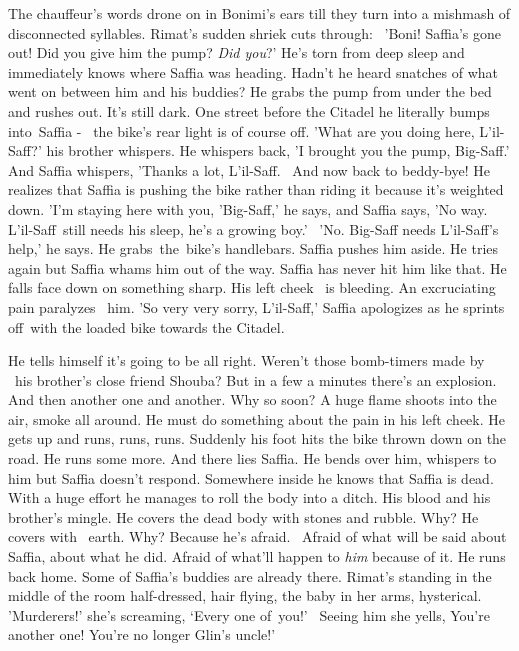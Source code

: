 \documentclass[12pt]{book}
\begin{document}
The chauffeur's words drone on in Bonimi's ears till they turn into a mishmash of disconnected syllables. Rimat's sudden
shriek cuts through: \ {}'Boni! Saffia's gone out! Did you give him the pump? \textit{Did you}?' He's torn from deep
sleep and immediately knows where Saffia was heading. Hadn't he heard snatches of what went on between him and his
buddies? He grabs the pump from under the bed and rushes out. It's still dark. One street before the Citadel he
literally bumps into~Saffia - \ the bike's rear light is of course off. 'What are you doing here, L'il-Saff?' his
brother whispers. He whispers back, 'I brought you the pump, Big-Saff.' And Saffia whispers, 'Thanks a lot, L'il-Saff.
~And now back to beddy-bye!{\textquotedbl} He realizes that Saffia is pushing the bike rather than riding it because
it's weighted down. 'I'm staying here with you, 'Big-Saff,' he says, and Saffia says, 'No way. L'il-Saff~still needs
his sleep, he's a growing boy.' \ {}'No. Big-Saff needs L'il-Saff's help,' he says. He grabs~the~bike's handlebars.
Saffia pushes him aside. He tries again but Saffia whams him out of the way. Saffia has never hit him like that. He
falls face down on something sharp. His left cheek{ \ }is bleeding. An excruciating pain paralyzes
\ him. 'So very very sorry, L'il-Saff,' Saffia apologizes as he sprints off~with the loaded bike towards the Citadel.

He tells himself it's going to be all right. Weren't those bomb-timers made by \ his brother's close friend Shouba? But
in a few a minutes there's an explosion. And then another one and another. Why so soon? A huge flame shoots into the
air, smoke all around. He must do something about the pain in his left cheek. He gets up and runs, runs, runs. Suddenly
his foot hits the bike thrown down on the road. He runs some more. And there lies Saffia. He bends over him, whispers
to him but Saffia doesn't respond. Somewhere inside he knows that Saffia is dead. With a huge effort he manages to roll
the body into a ditch. His blood and his brother's mingle{. }He covers the dead body with stones and
rubble. Why? He covers with \ earth. Why? Because he's afraid. ~Afraid of what will be said about Saffia, about what he
did. Afraid of what'll happen to \textit{him} because of it. He runs back home. Some of Saffia's buddies are already
there. Rimat's standing in the middle of the room half-dressed, hair flying, the baby in her arms, hysterical.
'Murderers!' she's screaming, `Every one of~you!' \ Seeing him she yells, {\textquotedbl}You're another one! You're no
longer Glin's uncle!'
\end{document}
